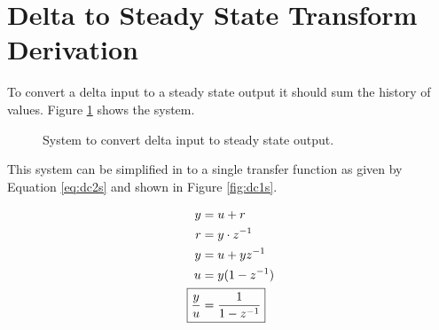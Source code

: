 \documentclass{article}
\begin{document}


\clearpage



\clearpage
\section{Delta to Steady State Transform Derivation}
\label{app:dsderiv}

To convert a delta input to a steady state output it should
sum the history of values.
Figure \ref{fig:dc1} shows the system.

\begin{figure}[hpb!]
\begin{center}


\end{center}

\caption{System to convert delta input to steady state output.}
\label{fig:dc1}
\end{figure}

This system can be simplified in to a single transfer function
as given by Equation \ref{eq:dc2s} and shown in Figure \ref{fig:dc1s}.

\begin{align}
	y &= u + r \notag \\
	r &= y \cdot z^{-1} \notag \\
	y &= u + y z^{-1} \notag \\
	u &= y(1 - z^{-1}) \notag \\
	\Aboxed{ \frac{y}{u} &= \frac{1}{1 - z^{-1}} } \label{eq:dc2s}
\end{align}
\end{document}
